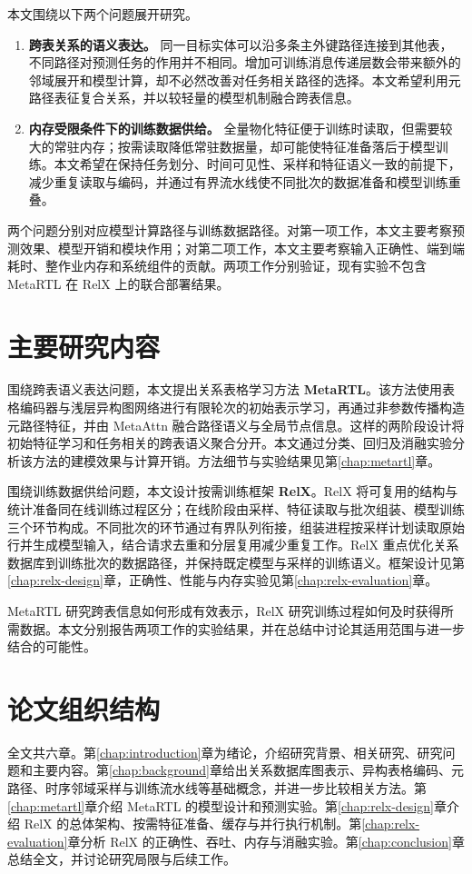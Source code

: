 本文围绕以下两个问题展开研究。

\begin{enumerate}
  \item \textbf{跨表关系的语义表达。} 同一目标实体可以沿多条主外键路径连接到其他表，不同路径对预测任务的作用并不相同。增加可训练消息传递层数会带来额外的邻域展开和模型计算，却不必然改善对任务相关路径的选择。本文希望利用元路径表征复合关系，并以较轻量的模型机制融合跨表信息。

  \item \textbf{内存受限条件下的训练数据供给。} 全量物化特征便于训练时读取，但需要较大的常驻内存；按需读取降低常驻数据量，却可能使特征准备落后于模型训练。本文希望在保持任务划分、时间可见性、采样和特征语义一致的前提下，减少重复读取与编码，并通过有界流水线使不同批次的数据准备和模型训练重叠。
\end{enumerate}

两个问题分别对应模型计算路径与训练数据路径。对第一项工作，本文主要考察预测效果、模型开销和模块作用；对第二项工作，本文主要考察输入正确性、端到端耗时、整作业内存和系统组件的贡献。两项工作分别验证，现有实验不包含 MetaRTL 在 RelX 上的联合部署结果。

\section{主要研究内容}

围绕跨表语义表达问题，本文提出关系表格学习方法 \textbf{MetaRTL}。该方法使用表格编码器与浅层异构图网络进行有限轮次的初始表示学习，再通过非参数传播构造元路径特征，并由 MetaAttn 融合路径语义与全局节点信息。这样的两阶段设计将初始特征学习和任务相关的跨表语义聚合分开。本文通过分类、回归及消融实验分析该方法的建模效果与计算开销。方法细节与实验结果见第\ref{chap:metartl}章。

围绕训练数据供给问题，本文设计按需训练框架 \textbf{RelX}。RelX 将可复用的结构与统计准备同在线训练过程区分；在线阶段由采样、特征读取与批次组装、模型训练三个环节构成。不同批次的环节通过有界队列衔接，组装进程按采样计划读取原始行并生成模型输入，结合请求去重和分层复用减少重复工作。RelX 重点优化关系数据库到训练批次的数据路径，并保持既定模型与采样的训练语义。框架设计见第\ref{chap:relx-design}章，正确性、性能与内存实验见第\ref{chap:relx-evaluation}章。

MetaRTL 研究跨表信息如何形成有效表示，RelX 研究训练过程如何及时获得所需数据。本文分别报告两项工作的实验结果，并在总结中讨论其适用范围与进一步结合的可能性。

\section{论文组织结构}

全文共六章。第\ref{chap:introduction}章为绪论，介绍研究背景、相关研究、研究问题和主要内容。第\ref{chap:background}章给出关系数据库图表示、异构表格编码、元路径、时序邻域采样与训练流水线等基础概念，并进一步比较相关方法。第\ref{chap:metartl}章介绍 MetaRTL 的模型设计和预测实验。第\ref{chap:relx-design}章介绍 RelX 的总体架构、按需特征准备、缓存与并行执行机制。第\ref{chap:relx-evaluation}章分析 RelX 的正确性、吞吐、内存与消融实验。第\ref{chap:conclusion}章总结全文，并讨论研究局限与后续工作。

